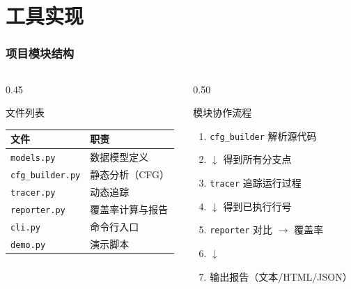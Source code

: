 \documentclass[presentation,aspectratio=169]{ctexbeamer}
\begin{document}

\section{工具实现}

\begin{frame}
\frametitle{项目模块结构}
\begin{columns}[T]
\begin{column}{0.45\textwidth}
\begin{block}{\footnotesize 文件列表}
{\footnotesize
\begin{tabular}{ll}
\toprule
\textbf{文件} & \textbf{职责} \\
\midrule
\texttt{models.py} & 数据模型定义 \\
\texttt{cfg\_builder.py} & 静态分析（CFG） \\
\texttt{tracer.py} & 动态追踪 \\
\texttt{reporter.py} & 覆盖率计算与报告 \\
\texttt{cli.py} & 命令行入口 \\
\texttt{demo.py} & 演示脚本 \\
\bottomrule
\end{tabular}}
\end{block}
\end{column}

\begin{column}{0.50\textwidth}
\begin{block}{\footnotesize 模块协作流程}
{\footnotesize
\centering
\begin{enumerate}
    \item \texttt{cfg\_builder} 解析源代码
    \item[] $\downarrow$ 得到所有分支点
    \item \texttt{tracer} 追踪运行过程
    \item[] $\downarrow$ 得到已执行行号
    \item \texttt{reporter} 对比 $\rightarrow$ 覆盖率
    \item[] $\downarrow$
    \item 输出报告（文本/HTML/JSON）
\end{enumerate}}
\end{block}
\end{column}
\end{columns}
\end{frame}
\end{document}

